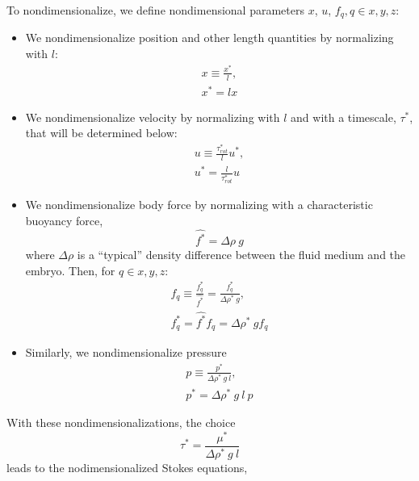 \documentclass[10pt,a4paper]{article}
\def\l{\mathit{l}}
\begin{document}
To nondimensionalize, we define nondimensional parameters $x$, $u$, $f_q, q \in x, y, z$:
\begin{itemize}
	\item We nondimensionalize position and other length quantities by normalizing with $l$:
	\begin{eqnarray*}
		x \equiv \frac{x^*}{\mathit{l}} , \\
		x^* = \mathit{l} x 
	\end{eqnarray*} 
	\item We nondimensionalize velocity by normalizing with $l$ and with a timescale, $\tau^*$, that will be determined below:
	\begin{eqnarray*}
		u \equiv \frac{\tau^*_{rot}}{\mathit{l}} u^* , \\
		u^* = \frac{\mathit{l}}{\tau^*_{rot}} u 
	\end{eqnarray*} 
	\item We nondimensionalize body force by normalizing with a characteristic buoyancy force,
	\begin{equation}\label{charforce}
		\hat{f^*} = \Delta \rho ~ g
	\end{equation}
	where $\Delta \rho$ is a ``typical'' density difference between the fluid medium and the embryo. 
	Then, for $q \in x, y, z$:
	\begin{eqnarray*}
		f_q \equiv \frac{f_q^*}{\hat{f^*}}  = \frac{f_q^*}{\Delta \rho^* ~ g} , \\
		f_q^* = \hat{f^*} f_q = \Delta \rho^* ~ g f_q
	\end{eqnarray*} 
	\item Similarly, we nondimensionalize pressure 
	\begin{eqnarray*}
		p \equiv  \frac{ p^*}{\Delta \rho^* ~ g ~ l} , \\
		p^* = \Delta \rho^* ~ g ~ l ~ p  
	\end{eqnarray*} 
\end{itemize}
With these nondimensionalizations, the choice 
\begin{equation}\label{tau_def}
	\tau^* = \frac{\mu^*}{\Delta \rho^* ~ g ~ l}
\end{equation}
leads to the nodimensionalized Stokes equations,
\end{document}
